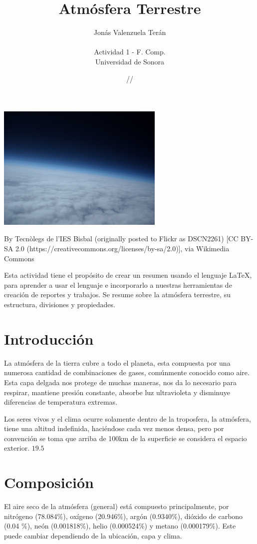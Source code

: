 \documentclass[11pt]{article}
\title{\textbf{Atmósfera Terrestre}}
\author{Jonás Valenzuela Terán\\ \\Actividad 1 - F. Comp.\\Universidad de Sonora}
\date{\oldstylenums{24}/\oldstylenums{01}/\oldstylenums{18}}
\begin{document}
\maketitle
 
 

\begin{center}
	\includegraphics[height=6cm]{atmosfera13.jpg}
	
    By Tecnòlegs de l'IES Bisbal (originally posted to Flickr as DSCN2261) [CC BY-SA 2.0 (https://creativecommons.org/licenses/by-sa/2.0)], via Wikimedia Commons
\end{center}

Esta actividad tiene el propósito de crear un resumen usando el lenguaje \LaTeX, para aprender a usar el lenguaje e incorporarlo a nuestras herramientas de creación de reportes y trabajos. Se resume sobre la atmósfera terrestre, su estructura, divisiones y propiedades.

\section{Introducción}
	La atmósfera de la tierra cubre a todo el planeta, esta compuesta por una numerosa cantidad de combinaciones de gases, comúnmente conocido como aire. Esta capa delgada nos protege de muchas maneras, nos da lo necesario para respirar, mantiene presión constante, absorbe luz ultravioleta y disminuye diferencias de temperatura extremas.
    
    Los seres vivos y el clima ocurre solamente dentro de la troposfera, la atmósfera, tiene una altitud indefinida, haciéndose cada vez menos densa, pero por convención se toma que arriba de 100km de la superficie se considera el espacio exterior. $19.5$



\section{Composición}
	El aire seco de la atmósfera (general) está compuesto principalmente, por nitrógeno (78.084\%), oxígeno (20.946\%), argón (0.9340\%), dióxido de carbono (0.04 \%), neón (0.001818\%), helio (0.000524\%) y metano (0.000179\%). Este puede cambiar dependiendo de la ubicación, capa y clima.
\end{document}
